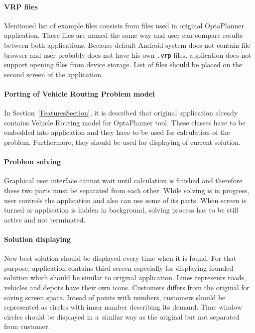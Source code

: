 \paragraph{VRP files}
Mentioned list of example files consists from files used in original OptaPlanner application. These files are named the
same way and user can compare results between both applications. Because default Android system does not contain file
browser and user probably does not have his own \texttt{.vrp} files, application does not support opening files from
device storage. List of files should be placed on the second screen of the application.

\paragraph{Porting of Vehicle Routing Problem model}
In Section~\ref{FeaturesSection}, it is described that original application already contains Vehicle Routing model for
OptaPlanner tool. These classes have to be embedded into application and they have to be used for calculation of the
problem. Furthermore, they should be used for displaying of current solution.

\paragraph{Problem solving}
Graphical user interface cannot wait until calculation is finished and therefore these two parts must be separated from
each other. While solving is in progress, user controls the application and also can use some of its parts. When screen
is turned or application is hidden in background, solving process has to be still active and not terminated.

\paragraph{Solution displaying}
New best solution should be displayed every time when it is found. For that purpose, application contains third screen
especially for displaying founded solution which should be similar to original application. Lines represents roads,
vehicles and depots have their own icons. Customers differs from the original for saving screen space. Intead of points
with numbers, customers should be represented as circles with inner number describing its demand. Time window circles
should be displayed in a~similar way as the original but not separated from customer.

